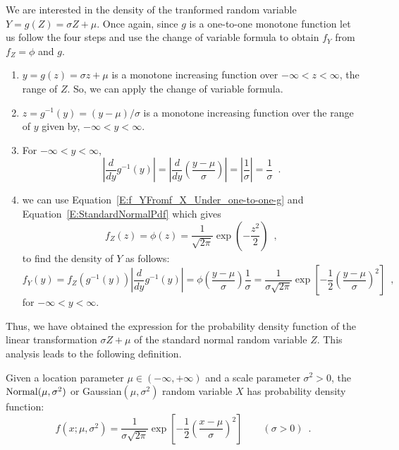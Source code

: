\begin{example}
We are interested in the density of the tranformed random variable $Y=g(Z)=\sigma Z + \mu$.  
Once again, since $g$ is a one-to-one monotone function let us follow the four steps and use the change of variable formula to obtain $f_Y$ from $f_Z=\phi$ and $g$.
\begin{enumerate}
\item $y=g(z)=\sigma z + \mu$ is a monotone increasing function over $-\infty < z < \infty$, the range of $Z$.  
So, we can apply the change of variable formula. 
\item $z=g^{-1}(y)=(y - \mu) / \sigma$ is a monotone increasing function over the range of $y$ given by, %
$-\infty < y < \infty$.  
\item For $-\infty < y < \infty$,
\[
 \left\vert \frac{d}{dy} g^{-1}(y) \right\vert 
= \left\vert \frac{d}{dy} \left( \frac{y - \mu}{\sigma} \right) \right\vert 
= \left\vert \frac{1}{\sigma} \right\vert = \frac{1}{\sigma} \enspace .
\]
\item we can use Equation~\eqref{E:f_YFromf_X_Under_one-to-one-g} and Equation~\eqref{E:StandardNormalPdf} which gives
$$f_Z(z) = \phi(z) = \frac{1}{\sqrt{2\pi}} \exp{\left( -\frac{z^2}{2}\right)} \enspace,$$
to find the density of $Y$ as follows:
\[
f_Y(y) = f_Z \left( g^{-1}(y) \right) \left\vert \frac{d}{dy} g^{-1}(y) \right\vert 
= \phi \left( \frac{y - \mu}{\sigma} \right) \frac{1}{\sigma}
= \frac{1}{\sigma \sqrt{2 \pi}} \exp \left[-\frac{1}{2} \left( \frac{y-\mu}{\sigma} \right)^2 \right] \enspace ,
\]
for $-\infty < y < \infty$. 
\end{enumerate}
Thus, we have obtained the expression for the probability density function of the linear transformation $\sigma Z + \mu$ of the standard normal random variable $Z$.  This analysis leads to the following definition.
\end{example}


\begin{framed}

\begin{model}
Given a location parameter $\mu \in (-\infty, +\infty)$ and a scale parameter $\sigma^2 > 0$, the $\mbox{{\rm Normal}}(\mu,\sigma^2)$ or Gaussian$(\mu,\sigma^2)$ random variable $X$ has probability density function:
\begin{equation}\label{eqn:norm_pdf}
f(x; \mu,
  \sigma^2)=\frac{1}{\sigma\sqrt{2\pi}}\exp\left[-\frac{1}{2}\left(\frac{x-\mu}{\sigma}\right)^2\right]\qquad(\sigma >0) \enspace .
\end{equation}
\end{model}
\end{framed}

